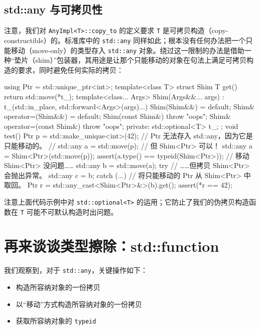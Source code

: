 \subsection{std::any 与可拷贝性}

注意，我们对 \texttt{Any\allowbreak{}Impl<\allowbreak{}T>\allowbreak{}::\allowbreak{}copy\_\allowbreak{}to} 的定义要求 \texttt{T} 是可拷贝构造（copy-constructible）的。标准库中的 \texttt{std::\allowbreak{}any} 同样如此；根本没有任何办法把一个只能移动（move-only）的类型存入 \texttt{std::\allowbreak{}any} 对象。绕过这一限制的办法是借助一种“垫片（shim）”包装器，其用途是让那个只能移动的对象在句法上满足可拷贝构造的要求，同时避免任何实际的拷贝：

\begin{codebox}[cpp]
    using Ptr = std::unique_ptr<int>;
    template<class T>
    struct Shim {
      T get() { return std::move(*t_); }
      template<class... Args>
      Shim(Args&&... args) : t_(std::in_place,
        std::forward<Args>(args)...) {}
      Shim(Shim&&) = default;
      Shim& operator=(Shim&&) = default;
      Shim(const Shim&) { throw "oops"; }
      Shim& operator=(const Shim&) { throw "oops"; }
      private:
      std::optional<T> t_;
    };
    void test()
    {
      Ptr p = std::make_unique<int>(42);
      // Ptr 无法存入 std::any，因为它是只能移动的。
      // std::any a = std::move(p);
      // 但 Shim<Ptr> 可以！
      std::any a = Shim<Ptr>(std::move(p));
      assert(a.type() == typeid(Shim<Ptr>));
      // 移动 Shim<Ptr> 没问题……
      std::any b = std::move(a);
      try {
        // ……但拷贝 Shim<Ptr> 会抛出异常。
        std::any c = b;
      } catch (...) {}
      // 将只能移动的 Ptr 从 Shim<Ptr> 中取回。
      Ptr r = std::any_cast<Shim<Ptr>&>(b).get();
      assert(*r == 42);
    }
\end{codebox}

注意上面代码示例中对 \texttt{std::\allowbreak{}optional<\allowbreak{}T>\allowbreak{}} 的运用；它防止了我们的伪拷贝构造函数在 \texttt{T} 可能不可默认构造时出问题。

\section{再来谈谈类型擦除：std::function}

我们观察到，对于 \texttt{std::\allowbreak{}any}，关键操作如下：

\begin{itemize}
\item 构造所容纳对象的一份拷贝
\item 以“移动”方式构造所容纳对象的一份拷贝
\item 获取所容纳对象的 \texttt{typeid}
\end{itemize}

